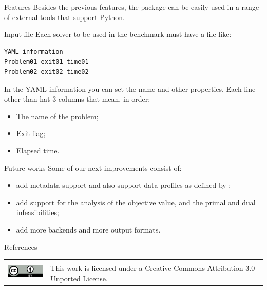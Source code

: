 \documentclass[a0paper,portrait]{baposter}
\begin{document}
\begin{poster}
\begin{posterbox}[column=1]{Features}
    Besides the previous features, the package can be easily used in a range
    of external tools that support Python.
  \end{posterbox}

  \begin{posterbox}[column=1,below=auto]{Input file}
    Each solver to be used in the benchmark must have a file like:

    \begin{lstlisting}
YAML information
Problem01 exit01 time01
Problem02 exit02 time02
    \end{lstlisting}

    In the YAML information you can set the name and other properties.
    Each line other than hat 3 columns that mean, in order:
    \begin{itemize}[noitemsep]
      \item The name of the problem;
      \item Exit flag;
      \item Elapsed time.
    \end{itemize}
  \end{posterbox}

  \begin{posterbox}[column=1,below=auto]{Future works}
    Some of our next improvements consist of:
    \begin{itemize}[noitemsep]
      \item add metadata support and also support data profiles as defined by
        \textcite{More2009};
      \item add support for the analysis of the objective value, and the primal and
        dual infeasibilities;
      \item add more backends and more output formats.
    \end{itemize}
  \end{posterbox}

  \begin{posterbox}[column=1,below=auto]{References}
    \printbibliography[heading=none]
  \end{posterbox}

  \begin{posterbox}[column=0,span=2,below=auto,height=bottom,
    boxshade=none,textborder=none,headerborder=none,headershade=plain,
  headerColorOne=bgcolor2, boxheaderheight=0cm]{}
  \begin{center}
    \begin{tabular}{cl}
      \multirow{3}{*}{\includegraphics[height=24pt]{figures/cc-by}} & \\
                                                                    & \Large
      This work is licensed under a
       Creative Commons Attribution 3.0 Unported License.
    \end{tabular}
  \end{center}
  \end{posterbox}
\end{poster}
\end{document}
